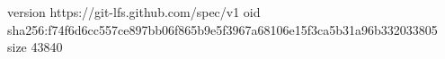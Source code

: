version https://git-lfs.github.com/spec/v1
oid sha256:f74f6d6cc557ce897bb06f865b9e5f3967a68106e15f3ca5b31a96b332033805
size 43840
